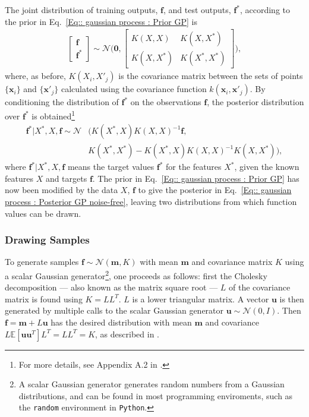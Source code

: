 \documentclass[twoside,english]{uiofysmaster}
\begin{document}
The joint distribution of training outputs, $\textbf{f}$, and test outputs, $\textbf{f}^*$, according to the prior in Eq.~\ref{Eq:: gaussian process : Prior GP} is
\begin{align}
\begin{bmatrix}
\textbf{f}\\
\textbf{f}^*
\end{bmatrix}
\sim 
\mathcal{N} \Bigg(
\boldsymbol{0},
\begin{bmatrix}
K(X, X) & K(X, X^*)\\
K(X, X^*) & K(X^*, X^*)
\end{bmatrix}
 \Bigg),
\end{align}
where, as before, $K(X_i, X'_j)$ is the covariance matrix between the sets of points $\{ \textbf{x}_i \}$ and $\{\textbf{x}'_j \}$ calculated using the covariance function $k(\textbf{x}_i, \textbf{x}'_j)$. By conditioning the distribution of $\textbf{f}^*$ on the observations $\textbf{f}$,  the posterior distribution over $\textbf{f}^*$ is obtained\footnote{For more details, see Appendix A.2 in \cite{rasmussen2006gaussian}.}  \cite{rasmussen2006gaussian} 
\begin{align}\label{Eq:: gaussian process : Posterior GP noise-free}
\textbf{f}^* \big| X^*, X, \textbf{f} \sim \mathcal{N}&(K(X^*, X)K(X, X)^{-1} \textbf{f},\\ &K(X^*, X^*) - K(X^*, X)K(X, X)^{-1}K(X, X^*)),
\end{align}
where $\textbf{f}^* | X^*, X, \textbf{f}$ means the target values $\textbf{f}^*$ for the features $X^*$, given the known features $X$ and targets $\textbf{f}$. The prior in Eq.~\ref{Eq:: gaussian process : Prior GP} has now been modified by the data $X$, $\textbf{f}$ to give the posterior in Eq.~\ref{Eq:: gaussian process : Posterior GP noise-free}, leaving two distributions from which function values can be drawn.


\subsubsection{Drawing Samples}

To generate samples $\textbf{f} \sim \mathcal{N}(\textbf{m}, K)$ with mean $\textbf{m}$ and covariance matrix $K$ using a scalar Gaussian generator\footnote{A scalar Gaussian generator generates random numbers from a Gaussian distributions, and can be found in most programming enviroments, such as the \verb|random| environment in \verb|Python|.}, one proceeds as follows: first the Cholesky decomposition --- also known as the matrix square root ---  $L$ of the covariance matrix is found using $K = LL^T$. $L$ is a lower triangular matrix. A vector $\textbf{u}$ is then generated by multiple calls to the scalar Gaussian generator $\textbf{u} \sim \mathcal{N}(0, I)$. Then $\textbf{f} = \textbf{m} + L \textbf{u}$ has the desired distribution with mean $\textbf{m}$ and covariance $L \mathbb{E} [\textbf{u} \textbf{u}^T]L^T = LL^T = K$, as described in \cite{rasmussen2006gaussian}.
\end{document}
